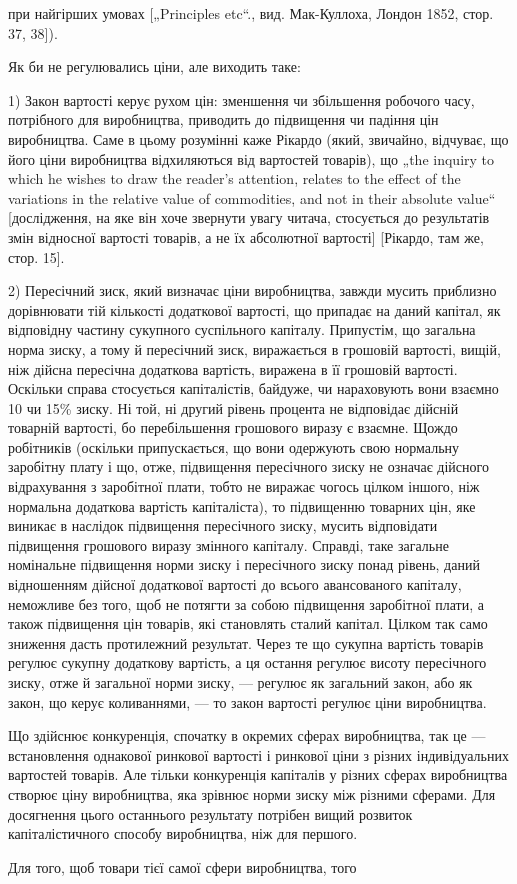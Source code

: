 \parcont{}  %
при найгірших умовах [„Principles etc“., вид. Мак-Куллоха, Лондон
1852, стор. 37, 38]).

Як би не регулювались ціни, але виходить таке:

1) Закон вартості керує рухом цін: зменшення чи збільшення
робочого часу, потрібного для виробництва, приводить до підвищення
чи падіння цін виробництва. Саме в цьому розумінні
каже Рікардо (який, звичайно, відчуває, що його ціни виробництва
відхиляються від вартостей товарів), що „the inquiry to
which he wishes to draw the reader’s attention, relates to the effect
of the variations in the relative value of commodities, and not in
their absolute value“ [дослідження, на яке він хоче звернути увагу
читача, стосується до результатів змін відносної вартості товарів,
а не їх абсолютної вартості] [Рікардо, там же, стор. 15].

2) Пересічний зиск, який визначає ціни виробництва, завжди
мусить приблизно дорівнювати тій кількості додаткової вартості,
що припадає на даний капітал, як відповідну частину сукупного
суспільного капіталу. Припустім, що загальна норма
зиску, а тому й пересічний зиск, виражається в грошовій вартості,
вищій, ніж дійсна пересічна додаткова вартість, виражена в її
грошовій вартості. Оскільки справа стосується капіталістів, байдуже,
чи нараховують вони взаємно 10 чи 15\% зиску. Ні той,
ні другий рівень процента не відповідає дійсній товарній вартості,
бо перебільшення грошового виразу є взаємне. Щождо
робітників (оскільки припускається, що вони одержують свою
нормальну заробітну плату і що, отже, підвищення пересічного
зиску не означає дійсного відрахування з заробітної плати,
тобто не виражає чогось цілком іншого, ніж нормальна додаткова
вартість капіталіста), то підвищенню товарних цін, яке
виникає в наслідок підвищення пересічного зиску, мусить відповідати
підвищення грошового виразу змінного капіталу. Справді,
таке загальне номінальне підвищення норми зиску і пересічного
зиску понад рівень, даний відношенням дійсної додаткової
вартості до всього авансованого капіталу, неможливе без того,
щоб не потягти за собою підвищення заробітної плати, а також
підвищення цін товарів, які становлять сталий капітал. Цілком
так само зниження дасть протилежний результат. Через те що
сукупна вартість товарів регулює сукупну додаткову вартість,
а ця остання регулює висоту пересічного зиску, отже й загальної
норми зиску, — регулює як загальний закон, або як закон, що
керує коливаннями, — то закон вартості регулює ціни виробництва.

Що здійснює конкуренція, спочатку в окремих сферах виробництва,
так це — встановлення однакової ринкової вартості
і ринкової ціни з різних індивідуальних вартостей товарів. Але
тільки конкуренція капіталів у різних сферах виробництва створює
ціну виробництва, яка зрівнює норми зиску між різними сферами.
Для досягнення цього останнього результату потрібен вищий
розвиток капіталістичного способу виробництва, ніж для першого.

Для того, щоб товари тієї самої сфери виробництва, того
\parbreak{}  %

